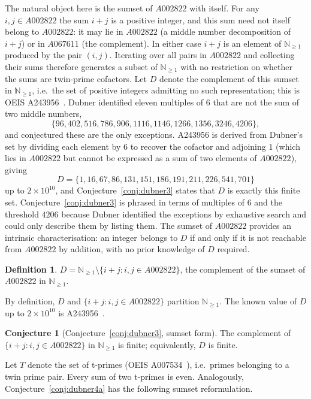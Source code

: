 \documentclass[12pt]{amsart}
\theoremstyle{definition}
\newtheorem{definition}[theorem]{Definition}
\newtheorem{conjecture}[theorem]{Conjecture}
\newcommand{\N}{\mathbb{N}}
\begin{document}
The natural object here is the sumset of $A002822$ with itself. For any $i, j \in A002822$
the sum $i + j$ is a positive integer, and this sum need not itself belong to $A002822$:
it may lie in $A002822$ (a middle number decomposition of $i+j$) or in $A067611$ (the complement).
In either case $i + j$ is an element of $\N_{\geq 1}$ produced by the pair $(i, j)$.
Iterating over all pairs in $A002822$ and collecting their sums therefore generates a
subset of $\N_{\geq 1}$ with no restriction on whether the sums are twin-prime cofactors.
Let $D$ denote the complement of this sumset in $\N_{\geq 1}$, i.e.\ the set of positive
integers admitting no such representation; this is OEIS A243956~\cite{oeis-a243956}.
Dubner identified eleven multiples of $6$ that are not the sum of two middle numbers,
\[
  \{96, 402, 516, 786, 906, 1116, 1146, 1266, 1356, 3246, 4206\},
\]
and conjectured these are the only exceptions. A243956 is derived from Dubner's set by
dividing each element by $6$ to recover the cofactor and adjoining $1$ (which lies in
$A002822$ but cannot be expressed as a sum of two elements of $A002822$), giving
\[
  D = \{1, 16, 67, 86, 131, 151, 186, 191, 211, 226, 541, 701\}
\]
up to $2 \times 10^{10}$, and Conjecture~\ref{conj:dubner3} states that $D$ is exactly
this finite set. Conjecture~\ref{conj:dubner3} is phrased in terms of multiples of $6$
and the threshold $4206$ because Dubner identified the exceptions by exhaustive search
and could only describe them by listing them. The sumset of $A002822$ provides an
intrinsic characterisation: an integer belongs to $D$ if and only if it is not reachable
from $A002822$ by addition, with no prior knowledge of $D$ required.

\begin{definition}
\label{def:D}
$D = \N_{\geq 1} \setminus \{ i + j : i, j \in A002822 \}$,
the complement of the sumset of $A002822$ in $\N_{\geq 1}$.
\end{definition}

By definition, $D$ and $\{ i + j : i, j \in A002822 \}$ partition $\N_{\geq 1}$.
The known value of $D$ up to $2 \times 10^{10}$ is A243956~\cite{oeis-a243956}.

\begin{conjecture}[Conjecture~\ref{conj:dubner3}, sumset form]
\label{conj:dubner3-sumset}
The complement of $\{ i + j : i, j \in A002822 \}$ in $\N_{\geq 1}$ is finite;
equivalently, $D$ is finite.
\end{conjecture}

Let $T$ denote the set of t-primes (OEIS A007534~\cite{oeis-a007534}), i.e.\ primes
belonging to a twin prime pair. Every sum of two t-primes is even. Analogously,
Conjecture~\ref{conj:dubner4a} has the following sumset reformulation.
\end{document}
